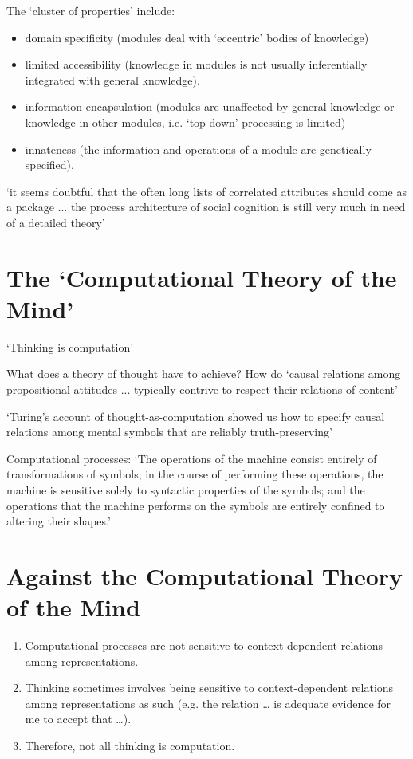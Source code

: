 \documentclass[11pt]{extarticle}
\begin{document}
\begin{multicols}{3}
The `cluster of properties' include: 
\begin{itemize}
\item	domain specificity (modules deal with ‘eccentric’ bodies of knowledge)
\item	limited accessibility (knowledge in modules is not usually inferentially integrated with general knowledge).
\item information encapsulation (modules are unaffected by general knowledge or knowledge in other modules, i.e. ‘top down’ processing is limited)
\item innateness (the information and operations of a module  are genetically specified).
\end{itemize}


`it seems doubtful that the often long lists of correlated attributes should come as a package ... the process architecture of social cognition is still very much in need of a detailed theory’\citep{adolphs_conceptual_2010} %



\section{The ‘Computational Theory of the Mind’}
‘Thinking is computation’\citep{Fodor:1998ap} %

What does a theory of thought have to achieve?  How do `causal relations among propositional attitudes ... typically contrive to respect their relations of content'\citep{Fodor:1987rt} %

‘Turing’s account of thought-as-computation showed us how to specify causal relations among mental symbols that are reliably truth-preserving’\citep{Fodor:1998ap} %

Computational processes:
‘The operations of the machine consist entirely of transformations of symbols;
in the course of performing these operations, the machine is sensitive solely to syntactic properties of the symbols;
and the operations that the machine performs on the symbols are entirely confined to altering their shapes.’\citep{Fodor:1987rt} %


\section{Against the Computational Theory of the Mind}
\begin{enumerate}
\item 	Computational processes are not sensitive to context-dependent relations among representations.
\item	Thinking sometimes involves being sensitive to context-dependent relations among representations as such (e.g. the relation … is adequate evidence for me to accept that …).
\item	Therefore, not all thinking is computation.
\end{enumerate}


\end{multicols}
\end{document}
